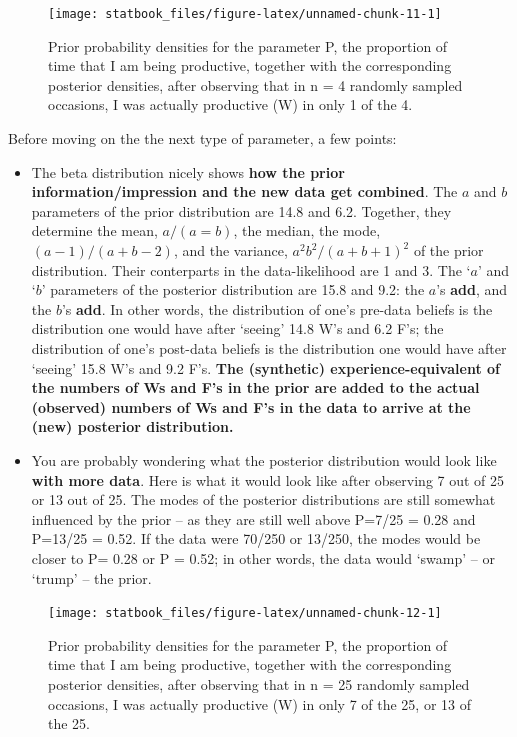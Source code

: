 \documentclass[]{book}
\begin{document}
\begin{figure}

{\centering \texttt{[image: statbook\_files/figure-latex/unnamed-chunk-11-1]} 

}

\caption{Prior probability densities for the parameter P, the proportion of time that I am being productive, together with the corresponding posterior densities, after observing that in n = 4 randomly sampled occasions, I was actually productive  (W) in only 1 of the 4.}\label{fig:unnamed-chunk-11}
\end{figure}

Before moving on the the next type of parameter, a few points:

\begin{itemize}
\item
  The beta distribution nicely shows \textbf{how the prior information/impression and the new data get combined}. The \(a\) and \(b\) parameters of the prior distribution are 14.8 and 6.2. Together, they determine the mean, \(a/(a=b)\), the median, the mode, \((a-1)/(a+b-2)\), and the variance,
  \(a^2b^2/(a+b+1)^2\) of the prior distribution.
  Their conterparts in the data-likelihood are 1 and 3. The `\(a\)' and `\(b\)' parameters of the posterior distribution are 15.8 and 9.2: the \(a\)'s \textbf{add}, and the \(b\)'s \textbf{add}. In other words, the distribution of one's pre-data beliefs is the distribution one would have after `seeing' 14.8 W's and 6.2 F's; the distribution of one's post-data beliefs is the distribution one would have after `seeing' 15.8 W's and 9.2 F's. \textbf{The (synthetic) experience-equivalent of the numbers of Ws and F's in the prior are added to the actual (observed) numbers of Ws and F's in the data to arrive at the (new) posterior distribution.}
\item
  You are probably wondering what the posterior distribution would look like \textbf{with more data}. Here is what it would look like after observing 7 out of 25 or 13 out of 25. The modes of the posterior distributions are still somewhat influenced by the prior -- as they are still well above P=7/25 = 0.28 and P=13/25 = 0.52. If the data were 70/250 or 13/250, the modes would be closer to P= 0.28 or P = 0.52; in other words, the data would `swamp' -- or `trump' -- the prior.
\end{itemize}

\begin{figure}

{\centering \texttt{[image: statbook\_files/figure-latex/unnamed-chunk-12-1]} 

}

\caption{Prior probability densities for the parameter P, the proportion of time that I am being productive, together with the corresponding posterior densities, after observing that in n = 25 randomly sampled occasions, I was actually productive (W) in only 7 of the 25, or 13 of the 25.}\label{fig:unnamed-chunk-12}
\end{figure}
\end{document}
